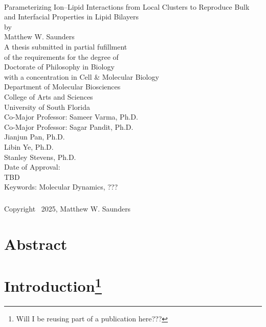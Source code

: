 \documentclass[12pt,openany,final]{book}
\author{Matthew Saunders}
\begin{document}
\pagestyle{plain}
\begin{titlepage}
\begin{centering}

~\\[1in]
Parameterizing Ion–Lipid Interactions from Local Clusters to Reproduce Bulk and Interfacial Properties in Lipid Bilayers
~\\[3\baselineskip]
by
~\\[3\baselineskip]
Matthew W. Saunders
~\\[4\baselineskip]
A thesis submitted in partial fufillment\\
of the requirements for the degree of\\
Doctorate of Philosophy in Biology \\ with a concentration in Cell \& Molecular Biology\\
Department of Molecular Biosciences\\
College of Arts and Sciences\\
University of South Florida
~\\[2\baselineskip]
Co-Major Professor: Sameer Varma, Ph.D.\\
Co-Major Professor: Sagar Pandit, Ph.D.\\
Jianjun Pan, Ph.D.\\
Libin Ye, Ph.D.\\
Stanley Stevens, Ph.D.
~\\[2\baselineskip]
Date of Approval:~\\
TBD
~\\[3\baselineskip]
Keywords: Molecular Dynamics, ???\\
~\\
Copyright \textsuperscript\textcopyright~2025, Matthew W. Saunders\\

\end{centering}
\end{titlepage}
\tableofcontents
{}
\listoftables
\listoffigures

\doublespacing
\chapter*{Abstract}


\chapter[Introduction]{Introduction\footnote{Will I be reusing part of a publication here???}}
\end{document}
